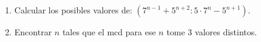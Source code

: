 \begin{enunciado}{\ejExtra}
  \begin{enumerate}[label=\roman*)]
    \item Calcular los posibles valores de: $(7^{n-1} + 5^{n+2} : 5\cdot 7^n - 5^{n+1})$.
    \item Encontrar $n$ tales que el mcd para ese $n$ tome 3 valores distintos.
  \end{enumerate}
\end{enunciado}
\hacer


